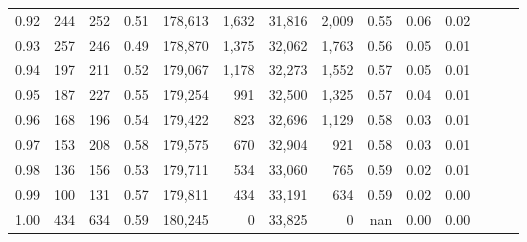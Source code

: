 \begin{tabular}{rrrrrrrrrrrrrr}
0.92 &    244 &  252 &  0.51 &  178,613 &    1,632 &  31,816 &   2,009 &  0.55 &  0.06 &      0.02 \\
0.93 &    257 &  246 &  0.49 &  178,870 &    1,375 &  32,062 &   1,763 &  0.56 &  0.05 &      0.01 \\
0.94 &    197 &  211 &  0.52 &  179,067 &    1,178 &  32,273 &   1,552 &  0.57 &  0.05 &      0.01 \\
0.95 &    187 &  227 &  0.55 &  179,254 &      991 &  32,500 &   1,325 &  0.57 &  0.04 &      0.01 \\
0.96 &    168 &  196 &  0.54 &  179,422 &      823 &  32,696 &   1,129 &  0.58 &  0.03 &      0.01 \\
0.97 &    153 &  208 &  0.58 &  179,575 &      670 &  32,904 &     921 &  0.58 &  0.03 &      0.01 \\
0.98 &    136 &  156 &  0.53 &  179,711 &      534 &  33,060 &     765 &  0.59 &  0.02 &      0.01 \\
0.99 &    100 &  131 &  0.57 &  179,811 &      434 &  33,191 &     634 &  0.59 &  0.02 &      0.00 \\
1.00 &    434 &  634 &  0.59 &  180,245 &        0 &  33,825 &       0 &   nan &  0.00 &      0.00 \\
\bottomrule
\end{tabular}

